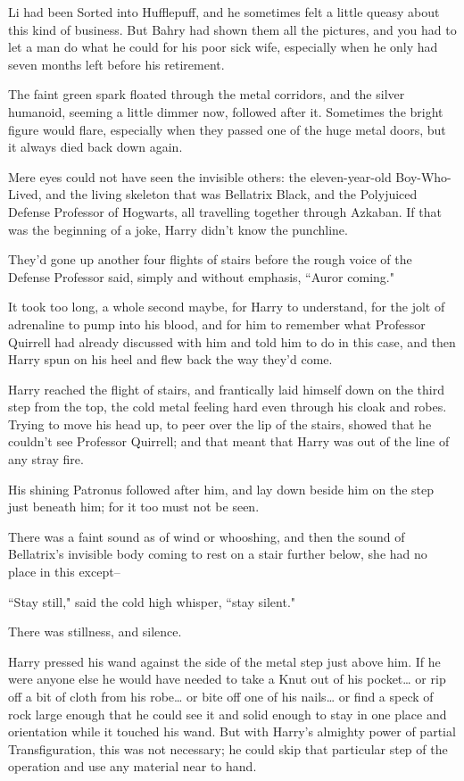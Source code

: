 Li had been Sorted into Hufflepuff, and he sometimes felt a little queasy about this kind of business. But Bahry had shown them all the pictures, and you had to let a man do what he could for his poor sick wife, especially when he only had seven months left before his retirement.

\later

The faint green spark floated through the metal corridors, and the silver humanoid, seeming a little dimmer now, followed after it. Sometimes the bright figure would flare, especially when they passed one of the huge metal doors, but it always died back down again.

Mere eyes could not have seen the invisible others: the eleven-year-old Boy-Who-Lived, and the living skeleton that was Bellatrix Black, and the Polyjuiced Defense Professor of Hogwarts, all travelling together through Azkaban. If that was the beginning of a joke, Harry didn't know the punchline.

They'd gone up another four flights of stairs before the rough voice of the Defense Professor said, simply and without emphasis, ``Auror coming."

It took too long, a whole second maybe, for Harry to understand, for the jolt of adrenaline to pump into his blood, and for him to remember what Professor Quirrell had already discussed with him and told him to do in this case, and then Harry spun on his heel and flew back the way they'd come.

Harry reached the flight of stairs, and frantically laid himself down on the third step from the top, the cold metal feeling hard even through his cloak and robes. Trying to move his head up, to peer over the lip of the stairs, showed that he couldn't see Professor Quirrell; and that meant that Harry was out of the line of any stray fire.

His shining Patronus followed after him, and lay down beside him on the step just beneath him; for it too must not be seen.

There was a faint sound as of wind or whooshing, and then the sound of Bellatrix's invisible body coming to rest on a stair further below, she had no place in this except\---

``Stay still," said the cold high whisper, ``stay silent."

There was stillness, and silence.

Harry pressed his wand against the side of the metal step just above him. If he were anyone else he would have needed to take a Knut out of his pocket{\ldots} or rip off a bit of cloth from his robe{\ldots} or bite off one of his nails{\ldots} or find a speck of rock large enough that he could see it and solid enough to stay in one place and orientation while it touched his wand. But with Harry's almighty power of partial Transfiguration, this was not necessary; he could skip that particular step of the operation and use any material near to hand.

